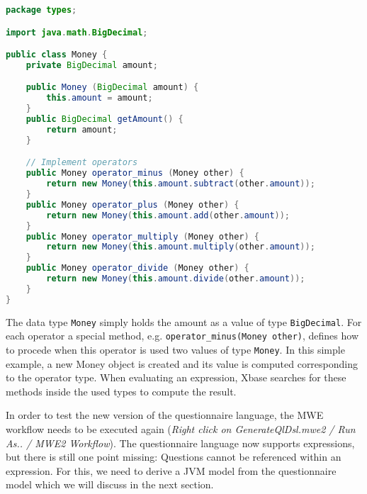 \begin{lstlisting}[language=Java]
package types;

import java.math.BigDecimal;

public class Money {
	private BigDecimal amount;

	public Money (BigDecimal amount) {
		this.amount = amount;
	}
	public BigDecimal getAmount() {
		return amount;
	}

	// Implement operators
	public Money operator_minus (Money other) {
		return new Money(this.amount.subtract(other.amount));
	}
	public Money operator_plus (Money other) {
		return new Money(this.amount.add(other.amount));
	}
	public Money operator_multiply (Money other) {
		return new Money(this.amount.multiply(other.amount));
	}
	public Money operator_divide (Money other) {
		return new Money(this.amount.divide(other.amount));
	}
}
\end{lstlisting}

The data type \texttt{Money} simply holds the amount as a value of type \texttt{BigDecimal}. For each
operator a special method, e.g. \texttt{operator\_minus(Money other)}, defines how to procede when this
operator is used two values of type \texttt{Money}. In this simple example, a new Money object is created
and its value is computed corresponding to the operator type. When evaluating an expression, Xbase searches
for these methods inside the used types to compute the result.

In order to test the new version of the questionnaire language, the MWE workflow needs to be executed
again (\emph{Right click on GenerateQlDsl.mwe2 / Run As.. / MWE2 Workflow}). The questionnaire language
now supports expressions, but there is still one point missing: Questions cannot be referenced within
an expression. For this, we need to derive a JVM model from the questionnaire model which we will discuss
in the next section.
